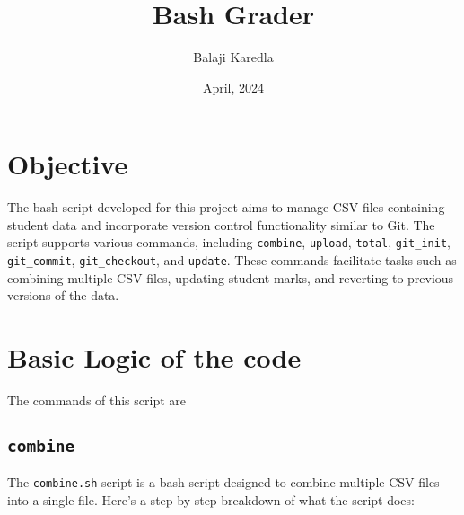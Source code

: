 \documentclass{article}
\title{Bash Grader}
\author{Balaji Karedla}
\date{April, 2024}
\begin{document}

\maketitle

{}

\tableofcontents

\pagebreak
{}

\section{Objective}
The bash script developed for this project aims to manage CSV files containing student data and incorporate version control functionality similar to Git. The script supports various commands, including \texttt{combine}, \texttt{upload}, \texttt{total}, \texttt{git\_init}, \texttt{git\_commit}, \texttt{git\_checkout}, and \texttt{update}. These commands facilitate tasks such as combining multiple CSV files, updating student marks, and reverting to previous versions of the data.
\section{Basic Logic of the code}
The commands of this script are
\subsection{\texttt{combine}}
The \texttt{combine.sh} script is a bash script designed to combine multiple CSV files into a single file. Here's a step-by-step breakdown of what the script does:
\end{document}
